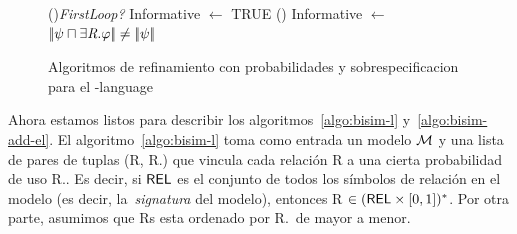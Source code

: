 \begin{figure}[!t]
\begin{algorithm}[H]
\If(){\em FirstLoop?}{
    Informative $\leftarrow$ TRUE }
\lElse() {Informative $\leftarrow$ $|\!|\psi \sqcap \exists \mbox{\em R}.\varphi|\!| \neq |\!|\psi|\!|$} 
\end{algorithm}
\vspace*{-.5cm}\caption{Algoritmos de refinamiento con probabilidades y sobrespecificacion para el \el-language}\label{fig:algo3}

\end{figure}


Ahora estamos listos para describir los algoritmos~\ref{algo:bisim-l}
y~\ref{algo:bisim-add-el}. El algoritmo~\ref{algo:bisim-l} toma como
entrada un modelo $\mathcal{M}$ y una lista de pares de tuplas (R, R.\puse) que vincula cada
relaci\'on R a una cierta probabilidad de uso R.\puse. Es decir, si $\textsf{REL}$ es el
conjunto de todos los s\'imbolos de relaci\'on en el modelo (es decir, la~\emph{signatura}
del modelo), entonces R $\in (\textsf{REL} \times [0,1])^*$. Por otra parte, asumimos que 
Rs esta ordenado por R.\puse\ de mayor a menor.


